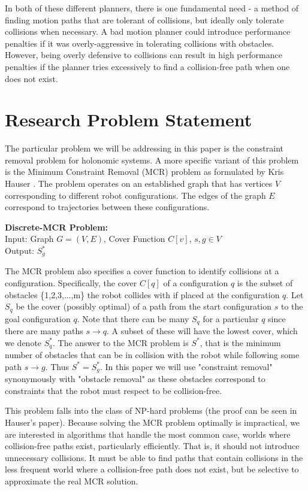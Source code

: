 In both of these different planners, there is one fundamental need - a method of finding motion paths that are tolerant of collisions, but ideally only tolerate collisions when necessary. A bad motion planner could introduce performance penalties if it was overly-aggressive in tolerating collisions with obstacles. However, being overly defensive to collisions can result in high performance penalties if the planner tries excessively to find a collision-free path when one does not exist. 

\section{Research Problem Statement} \label{intro:statement}
The particular problem we will be addressing in this paper is the constraint removal problem for holonomic systems. A more specific variant of this problem is the Minimum Constraint Removal (MCR) problem as formulated by Kris Hauser \cite{hauser:mcr}. The problem operates on an established graph that has vertices $V$ corresponding to different robot configurations. The edges of the graph $E$ correspond to trajectories between these configurations. 

\begin{mdframed}
{\bf{Discrete-MCR Problem:}}\\
Input: Graph $G = (V,E)$, Cover Function $C[v]$, $s,g \in V$ \\
Output: $S^{*}_g$
\end{mdframed}

The MCR problem also specifies a cover function to identify collisions at a configuration. Specifically, the cover $C[q]$ of a configuration $q$ is the subset of obstacles \{1,2,3,...,m\} the robot collides with if placed at the configuration $q$. Let $S_q$ be the cover (possibly optimal) of a path from the start configuration $s$ to the goal configuration $q$. Note that there can be many $S_q$ for a particular $q$ since there are many paths $s \rightarrow q$. A subset of these will have the lowest cover, which we denote $S^{*}_q$. The answer to the MCR problem is $S^{*}$, that is the minimum number of obstacles that can be in collision with the robot while following some path $s \rightarrow g$. Thus $S^{*} = S^{*}_g$. In this paper we will use "constraint removal" synonymously with "obstacle removal" as these obstacles correspond to constraints that the robot must respect to be collision-free.

This problem falls into the class of NP-hard problems (the proof can be seen in Hauser's paper). Because solving the MCR problem optimally is impractical, we are interested in algorithms that handle the most common case, worlds where collision-free paths exist, particularly efficiently. That is, it should not introduce unnecessary collisions. It must be able to find paths that contain collisions in the less frequent world where a collision-free path does not exist, but be selective to approximate the real MCR solution.

